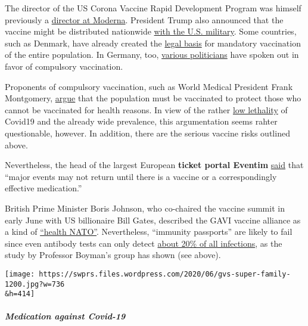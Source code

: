 The director of the US Corona Vaccine Rapid Development Program was
himself previously a
\href{https://www.businessinsider.com/moncef-slaoui-leading-trump-vaccine-push-10m-holding-moderna-conflict-2020-5}{director
at Moderna}. President Trump also announced that the vaccine might be
distributed nationwide
\href{https://www.msn.com/en-us/news/politics/trump-says-hes-mobilizing-military-to-distribute-potential-coronavirus-vaccine/ar-BB1463uZ}{with
the U.S. military}. Some countries, such as Denmark, have already
created the
\href{https://www.thelocal.dk/20200313/denmark-passes-far-reaching-emergency-coronavirus-law}{legal
basis} for mandatory vaccination of the entire population. In Germany,
too,
\href{https://www.swp.de/panorama/corona-impfpflicht-wird-die-impfung-bald-zur-vorschrift-in-deutschland_-das-ist-der-momentane-stand-45785279.html}{various
politicians} have spoken out in favor of compulsory vaccination.

Proponents of compulsory vaccination, such as World Medical President
Frank Montgomery,
\href{https://www.n-tv.de/panorama/Weltaerztepraesident-fordert-Impfpflicht-article21793158.html}{argue}
that the population must be vaccinated to protect those who cannot be
vaccinated for health reasons. In view of the rather
\href{https://swprs.org/studies-on-covid-19-lethality/}{low lethality}
of Covid19 and the already wide prevalence, this argumentation seems
rahter questionable, however. In addition, there are the serious vaccine
risks outlined above.

Nevertheless, the head of the largest European \textbf{ticket portal
Eventim}
\href{https://www.n-tv.de/mediathek/audio/Ohne-Impfstoff-keine-Konzerte-article21821926.html}{said}
that ``major events may not return until there is a vaccine or a
correspondingly effective medication.''

British Prime Minister Boris Johnson, who co-chaired the vaccine summit
in early June with US billionaire Bill Gates, described the GAVI vaccine
alliance as a kind of
\href{https://www.youtube.com/watch?v=1S0LAbObZV0}{``health NATO''}.
Nevertheless, ``immunity passports'' are likely to fail since even
antibody tests can only detect
\href{https://swprs.org/coronavirus-antibody-tests-show-only-one-fifth-of-infections/}{about
20\% of all infections}, as the study by Professor Boyman's group has
shown (see above).

\texttt{[image: https://swprs.files.wordpress.com/2020/06/gvs-super-family-1200.jpg?w=736\\\&h=414]}

\hypertarget{medication-against-covid-19}{%
\subparagraph{\texorpdfstring{\textbf{Medication against
Covid-19}}{Medication against Covid-19}}\label{medication-against-covid-19}}

